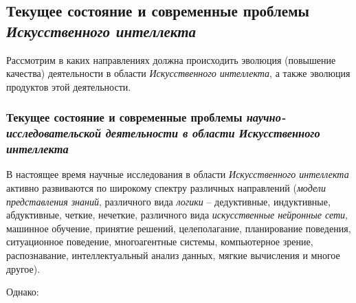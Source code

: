 \subsection{Текущее состояние и современные проблемы \textit{Искусственного интеллекта}}

Рассмотрим в каких направлениях должна происходить эволюция (повышение качества) деятельности в области \textit{Искусственного интеллекта}, а также эволюция продуктов этой деятельности.

\subsubsection{Текущее состояние и современные проблемы \textbf{\textit{научно-исследовательской деятельности в области}} \textbf{\textit{Искусственного интеллекта}}}

В настоящее время научные исследования в области \textit{Искусственного интеллекта} активно развиваются по широкому спектру различных направлений (\textit{модели представления знаний}, различного вида \textit{логики} -- дедуктивные, индуктивные, абдуктивные, четкие, нечеткие, различного вида \textit{искусственные нейронные сети}, машинное обучение, принятие решений, целеполагание, планирование поведения, ситуационное поведение, многоагентные системы, компьютерное зрение, распознавание, интеллектуальный анализ данных, мягкие вычисления и многое другое).

Однако:

